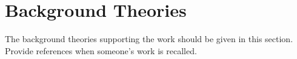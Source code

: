 
\section{Background Theories} 

The background theories supporting the work should be given in this section. Provide references when someone's work is recalled.